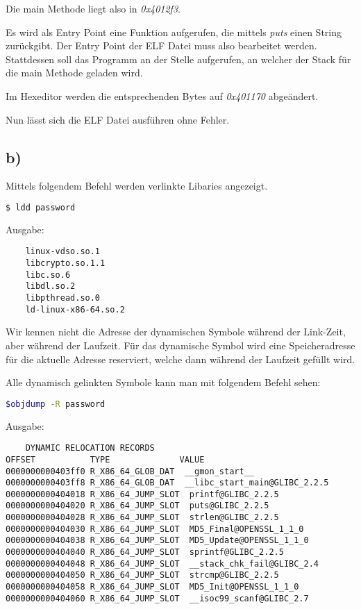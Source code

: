 Die main Methode liegt also in \textit{0x4012f3}.

Es wird als Entry Point eine Funktion aufgerufen, die mittels \textit{puts} einen String zurückgibt.
Der Entry Point der ELF Datei muss also bearbeitet werden.
Stattdessen soll das Programm an der Stelle aufgerufen, an welcher der Stack für die main Methode geladen wird.

Im Hexeditor werden die entsprechenden Bytes auf \textit{0x401170} abgeändert.

Nun lässt sich die ELF Datei ausführen ohne Fehler.

\subsection*{b)}

Mittels folgendem Befehl werden verlinkte Libaries angezeigt.

\begin{lstlisting}[language=bash]
    $ ldd password
\end{lstlisting}

Ausgabe:

\begin{lstlisting}
    linux-vdso.so.1
    libcrypto.so.1.1
    libc.so.6
    libdl.so.2
    libpthread.so.0
    ld-linux-x86-64.so.2
\end{lstlisting}

Wir kennen nicht die Adresse der dynamischen Symbole während der Link-Zeit, aber während der Laufzeit.
Für das dynamische Symbol wird eine Speicheradresse für die aktuelle Adresse reserviert, welche
dann während der Laufzeit gefüllt wird.

Alle dynamisch gelinkten Symbole kann man mit folgendem Befehl sehen:

\begin{lstlisting}[language=bash]
    $objdump -R password
\end{lstlisting}

Ausgabe:

\begin{lstlisting}
    DYNAMIC RELOCATION RECORDS
OFFSET           TYPE              VALUE
0000000000403ff0 R_X86_64_GLOB_DAT  __gmon_start__
0000000000403ff8 R_X86_64_GLOB_DAT  __libc_start_main@GLIBC_2.2.5
0000000000404018 R_X86_64_JUMP_SLOT  printf@GLIBC_2.2.5
0000000000404020 R_X86_64_JUMP_SLOT  puts@GLIBC_2.2.5
0000000000404028 R_X86_64_JUMP_SLOT  strlen@GLIBC_2.2.5
0000000000404030 R_X86_64_JUMP_SLOT  MD5_Final@OPENSSL_1_1_0
0000000000404038 R_X86_64_JUMP_SLOT  MD5_Update@OPENSSL_1_1_0
0000000000404040 R_X86_64_JUMP_SLOT  sprintf@GLIBC_2.2.5
0000000000404048 R_X86_64_JUMP_SLOT  __stack_chk_fail@GLIBC_2.4
0000000000404050 R_X86_64_JUMP_SLOT  strcmp@GLIBC_2.2.5
0000000000404058 R_X86_64_JUMP_SLOT  MD5_Init@OPENSSL_1_1_0
0000000000404060 R_X86_64_JUMP_SLOT  __isoc99_scanf@GLIBC_2.7
\end{lstlisting}

